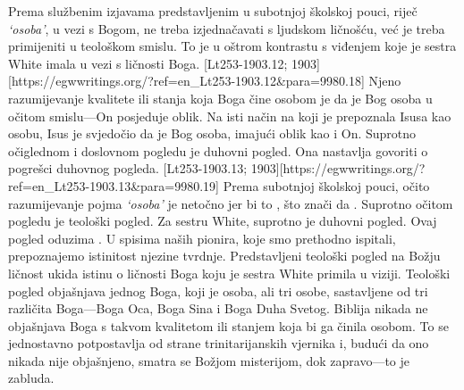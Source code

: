 Prema službenim izjavama predstavljenim u subotnjoj školskoj pouci, riječ \textit{‘osoba’}, u vezi s Bogom, ne treba izjednačavati s ljudskom ličnošću, već je treba primijeniti u teološkom smislu. To je u oštrom kontrastu s viđenjem koje je sestra White imala u vezi s ličnosti Boga. [Lt253-1903.12; 1903][https://egwwritings.org/?ref=en\_Lt253-1903.12&para=9980.18] Njeno razumijevanje kvalitete ili stanja koja Boga čine osobom je da je Bog osoba u očitom smislu—On posjeduje oblik. Na isti način na koji je prepoznala Isusa kao osobu, Isus je svjedočio da je Bog osoba, imajući oblik kao i On. Suprotno očiglednom i doslovnom pogledu je duhovni pogled. Ona nastavlja govoriti o pogrešci duhovnog pogleda. [Lt253-1903.13; 1903][https://egwwritings.org/?ref=en\_Lt253-1903.13&para=9980.19] Prema subotnjoj školskoj pouci, očito razumijevanje pojma \textit{‘osoba’} je netočno jer bi to , što znači da . Suprotno očitom pogledu je teološki pogled. Za sestru White, suprotno je duhovni pogled. Ovaj pogled oduzima . U spisima naših pionira, koje smo prethodno ispitali, prepoznajemo istinitost njezine tvrdnje. Predstavljeni teološki pogled na Božju ličnost ukida istinu o ličnosti Boga koju je sestra White primila u viziji. Teološki pogled objašnjava jednog Boga, koji je osoba, ali tri osobe, sastavljene od tri različita Boga—Boga Oca, Boga Sina i Boga Duha Svetog. Biblija nikada ne objašnjava Boga s takvom kvalitetom ili stanjem koja bi ga činila osobom. To se jednostavno potpostavlja od strane trinitarijanskih vjernika i, budući da ono nikada nije objašnjeno, smatra se Božjom misterijom, dok zapravo—to je zabluda.


